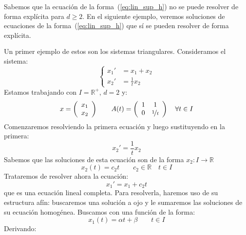 \noindent
Sabemos que la ecuación de la forma~(\ref{eq:lin_sup_h}) no se puede resolver de forma explícita para $d\geq 2$. En el siguiente ejemplo, veremos soluciones de ecuaciones de la forma~(\ref{eq:lin_sup_h}) que sí se pueden resolver de forma explícita.
\begin{ejemplo}
Un primer ejemplo de estos son los sistemas triangulares.
    Consideramos el sistema:
    \begin{equation*}
        \left\{\begin{array}{rl}
                x_1' &= x_1 + x_2 \\
            x_2' &= \frac{1}{t}x_2
        \end{array}\right.
    \end{equation*}
    Estamos trabajando con $I = \mathbb{R}^+$, $d=2$ y:
    \begin{equation*}
        x = \left(\begin{array}{c}
            x_1 \\
            x_2
        \end{array}\right) \qquad A(t) = \left(\begin{array}{cc}
            1 & 1 \\
            0 & \nicefrac{1}{t}
        \end{array}\right) \quad \forall t\in I
    \end{equation*}
    Comenzaremos resolviendo la primera ecuación y luego sustituyendo en la primera:
    \begin{equation*}
        x_2' = \dfrac{1}{t}x_2
    \end{equation*}
    Sabemos que las soluciones de esta ecuación son de la forma $x_2:I\rightarrow\mathbb{R}$
    \begin{equation*}
        x_2(t) = c_2 t \qquad c_2\in \mathbb{R} \quad t\in I
    \end{equation*}
    Trataremos de resolver ahora la ecuación:
    \begin{equation*}
        x_1' = x_1 + c_2 t
    \end{equation*}
    que es una ecuación lineal completa. Para resolverla, haremos uso de su estructura afín: buscaremos una solución a ojo y le sumaremos las soluciones de su ecuación homogénea. Buscamos con una función de la forma:
    \begin{equation*}
        x_1(t) = \alpha t + \beta \qquad t\in I
    \end{equation*}
    Derivando:
    \begin{equation*}

\end{equation*}
\end{ejemplo}
